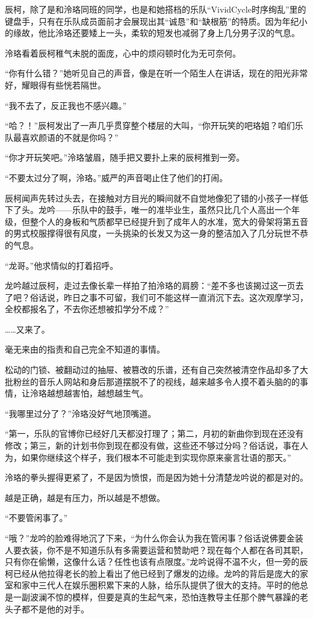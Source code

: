 \documentclass[UTF8, scheme = chinese, openany]{ctexbook}
\begin{document}
辰柯，除了是和泠珞同班的同学，也是和她搭档的乐队“VividCycle时序绚乱”里的键盘手，只有在乐队成员面前才会展现出其“诚恳”和“缺根筋”的特质。因为年纪小的缘故，他比泠珞还要矮上一头，柔软的短发也减弱了身上几分男子汉的气息。

泠珞看着辰柯稚气未脱的面庞，心中的烦闷顿时化为无可奈何。

“你有什么错？”她听见自己的声音，像是在听一个陌生人在讲话，现在的阳光非常好，耀眼得有些恍若隔世。

“我不去了，反正我也不感兴趣。”

“哈？！”辰柯发出了一声几乎贯穿整个楼层的大叫，“你开玩笑的吧珞姐？咱们乐队最喜欢颜语的不就是你吗？”

“你才开玩笑吧。”泠珞皱眉，随手把又要扑上来的辰柯推到一旁。

“不要太过分了啊，泠珞。”威严的声音喝止住了他们的打闹。

辰柯闻声先转过头去，在接触对方目光的瞬间就不自觉地像犯了错的小孩子一样低下了头。龙吟——乐队中的鼓手，唯一的准毕业生，虽然只比几个人高出一个年级，但整个人的身板和气质都早已经提升到了成年人的水准，宽大的骨架将第五音的男式校服撑得很有风度，一头挑染的长发又为这一身的整洁加入了几分玩世不恭的气息。

“龙哥。”他求情似的打着招呼。

龙吟越过辰柯，走过去像长辈一样拍了拍泠珞的肩膀：“差不多也该揭过这一页去了吧？俗话说，昨日之事不可留，我们可不能这样一直消沉下去。这次观摩学习，全校都报名了，不去你还想被扣学分不成？”

……又来了。

毫无来由的指责和自己完全不知道的事情。

松动的门锁、被翻动过的抽屉、被篡改的乐谱，还有自己突然被清空作品却多了大批粉丝的音乐人网站和身后那道摆脱不了的视线，越来越多令人摸不着头脑的的事情，让泠珞越想越害怕，越想越生气。

“我哪里过分了？”泠珞没好气地顶嘴道。

“第一，乐队的官博你已经好几天都没打理了；第二，月初的新曲你到现在还没有修改；第三，新的计划书你到现在都没有做，这些还不够过分吗？俗话说，事在人为，如果你继续这个样子，我们根本不可能走到实现你原来豪言壮语的那天。”

泠珞的拳头握得更紧了，不是因为愤恨，而是因为她十分清楚龙吟说的都是对的。

越是正确，越是有压力，所以越是不想做。

“不要管闲事了。”

“哦？”龙吟的脸难得地沉了下来，“为什么你会认为我在管闲事？俗话说佛要金装人要衣装，你不是不知道乐队有多需要运营和赞助吧？现在每个人都在各司其职，只有你在偷懒，这像什么话？任性也该有点限度。”龙吟说得不温不火，但一旁的辰柯已经从他拉得老长的脸上看出了他已经到了爆发的边缘。龙吟的背后是庞大的家室和家中三代人在娱乐圈积累下来的人脉，给乐队提供了很大的支持。平时的他总是一副波澜不惊的模样，但要是真的生起气来，恐怕连教导主任那个脾气暴躁的老头子都不是他的对手。
\end{document}
